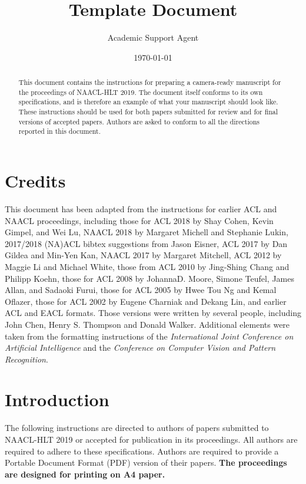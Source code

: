 \documentclass{article}
\title{Template Document}
\author{Academic Support Agent}
\date{\today}
\begin{document}
\maketitle

\maketitle
\begin{abstract}
  This document contains the instructions for preparing a camera-ready
  manuscript for the proceedings of NAACL-HLT 2019. The document itself
  conforms to its own specifications, and is therefore an example of
  what your manuscript should look like. These instructions should be
  used for both papers submitted for review and for final versions of
  accepted papers.  Authors are asked to conform to all the directions
  reported in this document.
\end{abstract}

\section{Credits}

This document has been adapted from the instructions
for earlier ACL and NAACL proceedings,
including 
those for ACL 2018 by Shay Cohen, Kevin Gimpel, and Wei Lu, 
NAACL 2018 by Margaret Michell and Stephanie Lukin,
2017/2018 (NA)ACL bibtex suggestions from Jason Eisner,
ACL 2017 by Dan Gildea and Min-Yen Kan, 
NAACL 2017 by Margaret Mitchell, 
ACL 2012 by Maggie Li and Michael White, 
those from ACL 2010 by Jing-Shing Chang and Philipp Koehn, 
those for ACL 2008 by JohannaD. Moore, Simone Teufel, James Allan, and Sadaoki Furui, 
those for ACL 2005 by Hwee Tou Ng and Kemal Oflazer, 
those for ACL 2002 by Eugene Charniak and Dekang Lin, 
and earlier ACL and EACL formats.
Those versions were written by several
people, including John Chen, Henry S. Thompson and Donald
Walker. Additional elements were taken from the formatting
instructions of the {\em International Joint Conference on Artificial
  Intelligence} and the \emph{Conference on Computer Vision and
  Pattern Recognition}.

\section{Introduction}

The following instructions are directed to authors of papers submitted
to NAACL-HLT 2019 or accepted for publication in its proceedings. All
authors are required to adhere to these specifications. Authors are
required to provide a Portable Document Format (PDF) version of their
papers. \textbf{The proceedings are designed for printing on A4
paper.}
\end{document}

